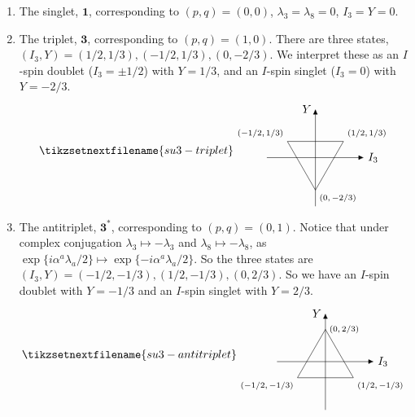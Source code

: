 \documentclass[fleqn]{NotesClass}
\newcommand{\rep}[1]{\symbf{#1}}
\begin{document}
    \begin{enumerate}
        \item The singlet, \(\rep{1}\), corresponding to \((p, q) = (0, 0)\), \(\lambda_3 = \lambda_8 = 0\), \(I_3 = Y = 0\).
        
        \item The triplet, \(\rep{3}\), corresponding to \((p, q) = (1, 0)\).
        There are three states, \((I_3, Y) = (1/2, 1/3), (-1/2, 1/3), (0, -2/3)\).
        We interpret these as an \(I\)-spin doublet (\(I_3 = \pm 1/2\)) with \(Y = 1/3\), and an \(I\)-spin singlet (\(I_3 = 0\)) with \(Y = -2/3\).
        \begin{equation}
            \tikzsetnextfilename{su3-triplet}
            \begin{tikzpicture}[
                >={Latex[width=1.5mm]},
                baseline = (current bounding box)
                ]
                \draw (30:1) node [above right] {\scriptsize\((1/2, 1/3)\)} -- (150:1) node [above left] {\scriptsize\((-1/2, 1/3)\)} -- (0, -1) node [below right] {\scriptsize\((0, -2/3)\)} -- cycle;
                \draw[->] (-1.5, 0) -- (1.5, 0) node [right] {\(I_3\)};
                \draw[->] (0, -1.5) -- (0, 1.5) node [left] {\(Y\)};
            \end{tikzpicture}
        \end{equation}
        
        \item The antitriplet, \(\rep{3}^*\), corresponding to \((p, q) = (0, 1)\).
        Notice that under complex conjugation \(\lambda_3 \mapsto -\lambda_3\) and \(\lambda_8 \mapsto -\lambda_8\), as \(\exp\{i\alpha^a \lambda_a/2\} \mapsto \exp\{-i\alpha^a \lambda_a/2\}\).
        So the three states are \((I_3, Y) = (-1/2, -1/3), (1/2, -1/3), (0, 2/3)\).
        So we have an \(I\)-spin doublet with \(Y = -1/3\) and an \(I\)-spin singlet with \(Y = 2/3\).
        \begin{equation}
            \tikzsetnextfilename{su3-antitriplet}
            \begin{tikzpicture}[
                >={Latex[width=1.5mm]},
                baseline = (current bounding box)
                ]
                \draw (-30:1) node [below right] {\scriptsize\((1/2, -1/3)\)} -- (-150:1) node [below left] {\scriptsize\((-1/2, -1/3)\)} -- (0, 1) node [right] {\scriptsize\((0, 2/3)\)} -- cycle;
                \draw[->] (-1.5, 0) -- (1.5, 0) node [right] {\(I_3\)};
                \draw[->] (0, -1.5) -- (0, 1.5) node [left] {\(Y\)};
            \end{tikzpicture}
        \end{equation}
        

\end{enumerate}
\end{document}
